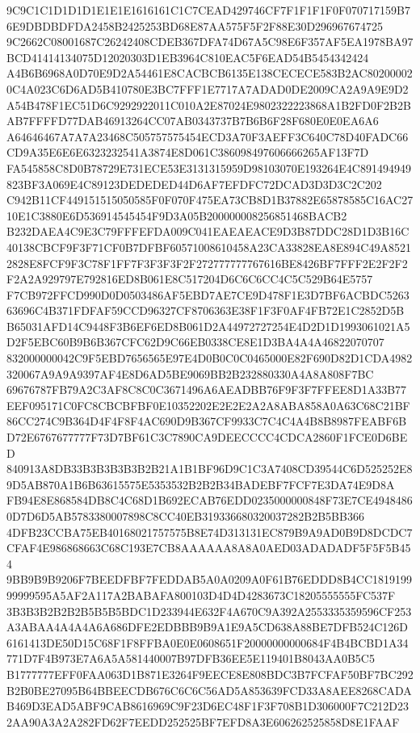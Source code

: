 \documentclass[UTF8,fontset=fandol,zihao=-4,a4paper]{ctexart}
\begin{document}
{{9C9C1C1D1D1D1E1E1E1616161C1C7CEAD429746CF7F1F1F1F0F070717159B76E9DBDBDFDA2458B2425253BD68E87AA575F5F2F88E30D296967674725
9C2662C08001687C26242408CDEB367DFA74D67A5C98E6F357AF5EA1978BA97BCD41414134075D12020303D1EB3964C810EAC5F6EAD54B5454342424
A4B6B6968A0D70E9D2A54461E8CACBCB6135E138CECECE583B2AC802000020C4A023C6D6AD5B410780E3BC7FFF1E7717A7ADAD0DE2009CA2A9A9E9D2
A54B478F1EC51D6C9292922011C010A2E87024E9802322223868A1B2FD0F2B2BAB7FFFFD77DAB46913264CC07AB0343737B7B6B6F28F680E0E0EA6A6
A64646467A7A7A23468C505757575454ECD3A70F3AEFF3C640C78D40FADC66CD9A35E6E6E6323232541A3874E8D061C386098497606666265AF13F7D
FA545858C8D0B78729E731ECE53E3131315959D98103070E193264E4C891494949823BF3A069E4C89123DEDEDED44D6AF7EFDFC72DCAD3D3D3C2C202
C942B11CF449151515050585F0F070F475EA73CB8D1B37882E65878585C16AC2710E1C3880E6D536914545454F9D3A05B200000008256851468BACB2
B232DAEA4C9E3C79FFFEFDA009C041EAEAEACE9D3B87DDC28D1D3B16C40138CBCF9F3F71CF0B7DFBF60571008610458A23CA33828EA8E894C49A8521
2828E8FCF9F3C78F1FF7F3F3F3F2F272777777767616BE8426BF7FFF2E2F2F2F2A2A929797E792816ED8B061E8C517204D6C6C6CC4C5C529B64E5757
F7CB972FFCD990D0D0503486AF5EBD7AE7CE9D478F1E3D7BF6ACBDC526363696C4B371FDFAF59CCD96327CF8706363E38F1F3F0AF4FB72E1C2852D5B
B65031AFD14C9448F3B6EF6ED8B061D2A44972727254E4D2D1D1993061021A5D2F5EBC60B9B6B367CFC62D9C66EB0338CE8E1D3BA4A4A46822070707
832000000042C9F5EBD7656565E97E4D0B0C0C0465000E82F690D82D1CDA4982320067A9A9A9397AF4E8D6AD5BE9069BB2B232880330A4A8A808F7BC
69676787FB79A2C3AF8C8C0C3671496A6AEADBB76F9F3F7FFEE8D1A33B77EEF095171C0FC8CBCBFBF0E10352202E2E2E2A2A8ABA858A0A63C68C21BF
86CC274C9B364D4F4F8F4AC690D9B367CF9933C7C4C4A4B8B8987FEABF6BD72E6767677777F73D7BF61C3C7890CA9DEECCCC4CDCA2860F1FCE0D6BED
840913A8DB33B3B3B3B3B2B21A1B1BF96D9C1C3A7408CD39544C6D525252E89D5AB870A1B6B63615575E5353532B2B2B34BADEBF7FCF7E3DA74E9D8A
FB94E8E868584DB8C4C68D1B692ECAB76EDD0235000000848F73E7CE49484860D7D6D5AB5783380007898C8CC40EB319336680320037282B2B5BB366
4DFB23CCBA75EB40168021757575B8E74D313131EC879B9A9AD0B9D8DCDC7CFAF4E986868663C68C193E7CB8AAAAAA8A8A0AED03ADADADF5F5F5B454
9BB9B9B9206F7BEEDFBF7FEDDAB5A0A0209A0F61B76EDDD8B4CC181919999999595A5AF2A117A2BABAFA800103D4D4D4283673C18205555555FC537F
3B3B3B2B2B2B5B5B5BDC1D233944E632F4A670C9A392A2553335359596CF253A3ABAA4A4A4A6A686DFE2EDBBB9B9A1E9A5CD638A88BE7DFB524C126D
6161413DE50D15C68F1F8FFBA0E0E0608651F20000000000684F4B4BCBD1A34771D7F4B973E7A6A5A581440007B97DFB36EE5E119401B8043AA0B5C5
B1777777EFF0FAA063D1B871E3264F9EECE8E808BDC3B7FCFAF50BF7BC292B2B0BE27095B64BBEECDB676C6C6C56AD5A853639FCD33A8AEE8268CADA
B469D3EAD5ABF9CAB8616969C9F23D6EC48F1F3F708B1D306000F7C212D232AA90A3A2A282FD62F7EEDD252525BF7EFD8A3E606262525858D8E1FAAF
}}
\end{document}

